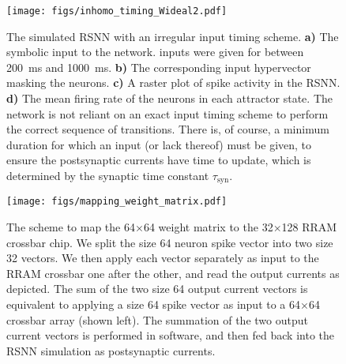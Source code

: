 \begin{figure}
    \centering
    \texttt{[image: figs/inhomo\_timing\_Wideal2.pdf]}
    \caption{The simulated RSNN with an irregular input timing scheme. \textbf{a)} The symbolic input to the network. inputs were given for between \qty{200}{ms} and \qty{1000}{ms}. \textbf{b)} The corresponding input hypervector masking the neurons. \textbf{c)} A raster plot of spike activity in the RSNN. \textbf{d)} The mean firing rate of the neurons in each attractor state. The network is not reliant on an exact input timing scheme to perform the correct sequence of transitions. There is, of course, a minimum duration for which an input (or lack thereof) must be given, to ensure the postsynaptic currents have time to update, which is determined by the synaptic time constant $\tau_\text{syn}$.}
    \label{fig:sim_inhomo_timing}
\end{figure}


\begin{figure}
\centering
\texttt{[image: figs/mapping\_weight\_matrix.pdf]}
\caption{The scheme to map the 64$\times$64 weight matrix to the 32$\times$128 RRAM crossbar chip. We split the size 64 neuron spike vector into two size 32 vectors. We then apply each vector separately as input to the RRAM crossbar one after the other, and read the output currents as depicted. The sum of the two size 64 output current vectors is equivalent to applying a size 64 spike vector as input to a 64$\times$64 crossbar array (shown left). The summation of the two output current vectors is performed in software, and then fed back into the RSNN simulation as postsynaptic currents.}
\label{fig:64x64_to_32x128}
\end{figure}



